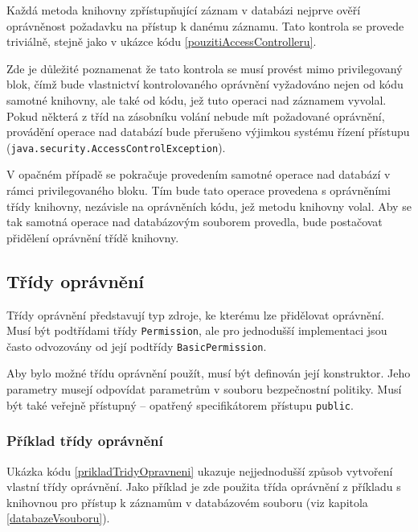 Každá metoda knihovny zpřístupňující záznam v databázi nejprve ověří oprávněnost požadavku na přístup k danému záznamu. Tato kontrola se provede triviálně, stejně jako v ukázce kódu \ref{pouzitiAccessControlleru}.

Zde je důležité poznamenat že tato kontrola se musí provést mimo privilegovaný blok, čímž bude vlastnictví kontrolovaného oprávnění vyžadováno nejen od kódu samotné knihovny, ale také od kódu, jež tuto operaci nad záznamem vyvolal. Pokud některá z tříd na zásobníku volání nebude mít požadované oprávnění, provádění operace nad databází bude přerušeno výjimkou systému řízení přístupu ({\tt java.security.AccessControlException}).

V opačném případě se pokračuje provedením samotné operace nad databází v rámci privilegovaného bloku. Tím bude tato operace provedena s oprávněními třídy knihovny, nezávisle na oprávněních kódu, jež metodu knihovny volal. Aby se tak samotná operace nad databázovým souborem provedla, bude postačovat přidělení oprávnění třídě knihovny.

\subsection{Třídy oprávnění}

Třídy oprávnění představují typ zdroje, ke kterému lze přidělovat oprávnění. Musí být podtřídami třídy {\tt Permission}, ale pro jednodušší implementaci jsou často odvozovány od její podtřídy {\tt BasicPermission}.

Aby bylo možné třídu oprávnění použít, musí být definován její konstruktor. Jeho parametry musejí odpovídat parametrům v souboru bezpečnostní politiky. Musí být také veřejně přístupný -- opatřený specifikátorem přístupu {\tt public}.

\subsubsection{Příklad třídy oprávnění}

Ukázka kódu \ref{prikladTridyOpravneni} ukazuje nejjednodušší způsob vytvoření vlastní třídy oprávnění. Jako příklad je zde použita třída oprávnění z příkladu s knihovnou pro přístup k záznamům v databázovém souboru (viz kapitola \ref{databazeVsouboru}).

